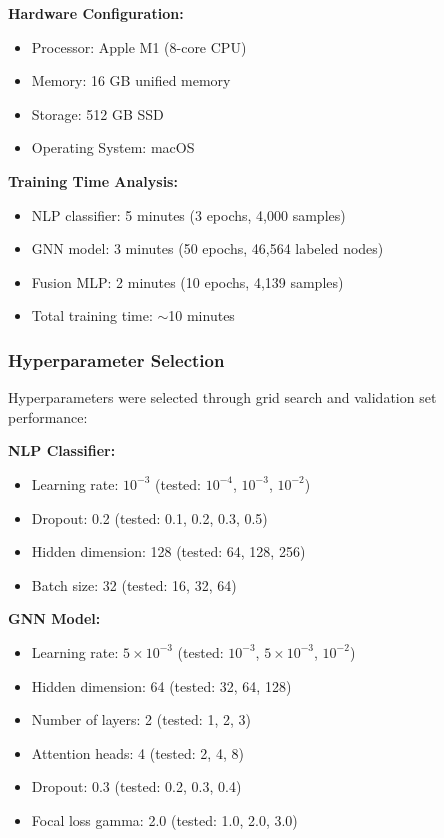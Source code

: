 \textbf{Hardware Configuration:}
\begin{itemize}
    \item Processor: Apple M1 (8-core CPU)
    \item Memory: 16 GB unified memory
    \item Storage: 512 GB SSD
    \item Operating System: macOS
\end{itemize}

\textbf{Training Time Analysis:}
\begin{itemize}
    \item NLP classifier: 5 minutes (3 epochs, 4,000 samples)
    \item GNN model: 3 minutes (50 epochs, 46,564 labeled nodes)
    \item Fusion MLP: 2 minutes (10 epochs, 4,139 samples)
    \item Total training time: $\sim$10 minutes
\end{itemize}

\subsubsection{Hyperparameter Selection}

Hyperparameters were selected through grid search and validation set performance:

\textbf{NLP Classifier:}
\begin{itemize}
    \item Learning rate: $10^{-3}$ (tested: $10^{-4}$, $10^{-3}$, $10^{-2}$)
    \item Dropout: 0.2 (tested: 0.1, 0.2, 0.3, 0.5)
    \item Hidden dimension: 128 (tested: 64, 128, 256)
    \item Batch size: 32 (tested: 16, 32, 64)
\end{itemize}

\textbf{GNN Model:}
\begin{itemize}
    \item Learning rate: $5 \times 10^{-3}$ (tested: $10^{-3}$, $5 \times 10^{-3}$, $10^{-2}$)
    \item Hidden dimension: 64 (tested: 32, 64, 128)
    \item Number of layers: 2 (tested: 1, 2, 3)
    \item Attention heads: 4 (tested: 2, 4, 8)
    \item Dropout: 0.3 (tested: 0.2, 0.3, 0.4)
    \item Focal loss gamma: 2.0 (tested: 1.0, 2.0, 3.0)
\end{itemize}

